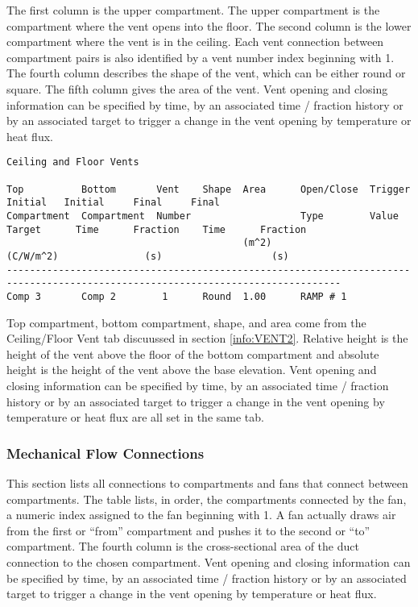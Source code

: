 The first column is the upper compartment.  The upper compartment is the compartment where the vent opens into the floor.  The second column is the lower compartment where the vent is in the ceiling. Each vent connection between compartment pairs is also identified by a vent number index beginning with 1. The fourth column describes the shape of the vent, which can be either round or square.  The fifth column gives the area of the vent. Vent opening and closing information can be specified by time, by an associated time / fraction history or by an associated target to trigger a change in the vent opening by temperature or heat flux.
\newpage
\begin{lstlisting}[basicstyle=\tiny]
Ceiling and Floor Vents

Top          Bottom       Vent    Shape  Area      Open/Close  Trigger                 Initial   Initial     Final     Final
Compartment  Compartment  Number                   Type        Value       Target      Time      Fraction    Time      Fraction
                                         (m^2)                 (C/W/m^2)               (s)                   (s)
--------------------------------------------------------------------------------------------------------------------------------
Comp 3       Comp 2        1      Round  1.00      RAMP # 1  
\end{lstlisting}
Top compartment, bottom compartment, shape, and area come from the Ceiling/Floor Vent tab discuussed in section \ref{info:VENT2}. Relative height is the height of the vent above the floor of the bottom compartment and absolute height is the height of the vent above the base elevation.  Vent opening and closing information can be specified by time, by an associated time / fraction history or by an associated target to trigger a change in the vent opening by temperature or heat flux are all set in the same tab.

\subsubsection{Mechanical Flow Connections}

This section lists all connections to compartments and fans that connect between compartments. The table lists, in order, the compartments connected by the fan, a numeric index assigned to the fan beginning with 1.  A fan actually draws air from the first or ``from'' compartment and pushes it to the second or ``to'' compartment. The fourth column is the cross-sectional area of the duct connection to the chosen compartment. Vent opening and closing information can be specified by time, by an associated time / fraction history or by an associated target to trigger a change in the vent opening by temperature or heat flux.

